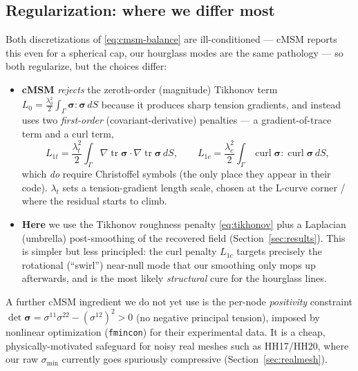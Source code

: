 \documentclass[11pt]{article}
\begin{document}
\subsection{Regularization: where we differ most}
Both discretizations of \eqref{eq:cmsm-balance} are ill-conditioned --- cMSM reports this even
for a spherical cap, our hourglass modes are the same pathology --- so both regularize, but
the choices differ:
\begin{itemize}[noitemsep]
  \item \textbf{cMSM} \emph{rejects} the zeroth-order (magnitude) Tikhonov term
        $L_0=\tfrac{\lambda_0^2}{2}\!\int_\Gamma\bm\sigma\!:\!\bm\sigma\,dS$ because it
        produces sharp tension gradients, and instead uses two \emph{first-order}
        (covariant-derivative) penalties --- a gradient-of-trace term and a curl term,
        \begin{equation}
          L_{1t}=\frac{\lambda_t^2}{2}\!\int_\Gamma\!\nabla\!\operatorname{tr}\bm\sigma\cdot
                  \nabla\!\operatorname{tr}\bm\sigma\,dS,
          \qquad
          L_{1c}=\frac{\lambda_c^2}{2}\!\int_\Gamma\!\operatorname{curl}\bm\sigma:
                  \operatorname{curl}\bm\sigma\,dS,
        \end{equation}
        which \emph{do} require Christoffel symbols (the only place they appear in their code).
        $\lambda_t$ sets a tension-gradient length scale, chosen at the L-curve corner / where
        the residual starts to climb.
  \item \textbf{Here} we use the Tikhonov roughness penalty \eqref{eq:tikhonov} plus a
        Laplacian (umbrella) post-smoothing of the recovered field
        (Section~\ref{sec:results}). This is simpler but less principled: the curl penalty
        $L_{1c}$ targets precisely the rotational (``swirl'') near-null mode that our smoothing
        only mops up afterwards, and is the most likely \emph{structural} cure for the
        hourglass lines.
\end{itemize}
A further cMSM ingredient we do not yet use is the per-node \emph{positivity} constraint
$\det\bm\sigma=\sigma^{11}\sigma^{22}-(\sigma^{12})^2>0$ (no negative principal tension),
imposed by nonlinear optimization (\texttt{fmincon}) for their experimental data. It is a
cheap, physically-motivated safeguard for noisy real meshes such as HH17/HH20, where our raw
$\sigma_{\min}$ currently goes spuriously compressive (Section~\ref{sec:realmesh}).
\end{document}
